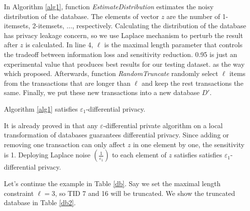 \documentclass[conference]{IEEEtran}
\begin{document}
In Algorithm \ref{alg1}, function {\it{EstimateDistribution}} estimates the noisy distribution of the database.
The elements of vector $z$ are the number of 1-itemsets, 2-itemsets, $\ldots$, respectively.
Calculating the distribution of the database has privacy leakage concern, so we use Laplace mechanism to perturb the result after $z$ is calculated.
In line 4, $\ell$ is the maximal length parameter that controls the tradeoff between information loss and sensitivity reduction.
0.95 is just an experimental value that produces best results for our testing dataset.
as the way which \cite{b6} proposed.
Afterwards, function {\it{RandomTruncate}} randomly select $\ell$ items from the transactions that are longer than $\ell$ and keep the rest transactions the same.
Finally, we put these new transactions into a new database $D'$.
\begin{theorem}
Algorithm \ref{alg1} satisfies $\varepsilon_1$-differential privacy.
\label{th1}
\end{theorem}
\begin{IEEEproof}
It is already proved in \cite{b6} that any $\varepsilon$-differential private algorithm on a local transformation of databases guarantees differential privacy.
Since adding or removing one transaction can only affect $z$ in one element by one, the sensitivity is 1.
Deploying Laplace noise $(\frac{1}{\varepsilon_1})$ to each element of $z$ satisfies satisfies $\varepsilon_1$-differential privacy.
\end{IEEEproof}

\begin{example}
    Let's continue the example in Table \ref{db}. 
    Say we set the maximal length constraint $\ell=3$, so TID 7 and 16 will be truncated.
    We show the truncated database in Table \ref{db2}.
\end{example} 
\end{document}
